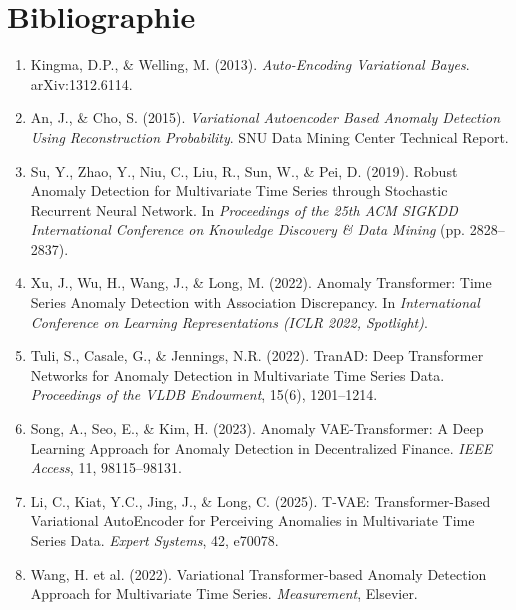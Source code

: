 \documentclass[12pt,a4paper]{article}
\begin{document}
\section*{Bibliographie}

\begin{enumerate}
\item[\lbrack F1\rbrack] Kingma, D.P., \& Welling, M. (2013). \textit{Auto-Encoding Variational Bayes}. arXiv:1312.6114.

\item[\lbrack F2\rbrack] An, J., \& Cho, S. (2015). \textit{Variational Autoencoder Based Anomaly Detection Using Reconstruction Probability}. SNU Data Mining Center Technical Report.

\item[\lbrack F3\rbrack] Su, Y., Zhao, Y., Niu, C., Liu, R., Sun, W., \& Pei, D. (2019). Robust Anomaly Detection for Multivariate Time Series through Stochastic Recurrent Neural Network. In \textit{Proceedings of the 25th ACM SIGKDD International Conference on Knowledge Discovery \& Data Mining} (pp. 2828--2837).

\item[\lbrack T1\rbrack] Xu, J., Wu, H., Wang, J., \& Long, M. (2022). Anomaly Transformer: Time Series Anomaly Detection with Association Discrepancy. In \textit{International Conference on Learning Representations (ICLR 2022, Spotlight)}.

\item[\lbrack T2\rbrack] Tuli, S., Casale, G., \& Jennings, N.R. (2022). TranAD: Deep Transformer Networks for Anomaly Detection in Multivariate Time Series Data. \textit{Proceedings of the VLDB Endowment}, 15(6), 1201--1214.

\item[\lbrack H1\rbrack] Song, A., Seo, E., \& Kim, H. (2023). Anomaly VAE-Transformer: A Deep Learning Approach for Anomaly Detection in Decentralized Finance. \textit{IEEE Access}, 11, 98115--98131.

\item[\lbrack H2\rbrack] Li, C., Kiat, Y.C., Jing, J., \& Long, C. (2025). T-VAE: Transformer-Based Variational AutoEncoder for Perceiving Anomalies in Multivariate Time Series Data. \textit{Expert Systems}, 42, e70078.

\item[\lbrack H3\rbrack] Wang, H. et al. (2022). Variational Transformer-based Anomaly Detection Approach for Multivariate Time Series. \textit{Measurement}, Elsevier.


\end{enumerate}
\end{document}
